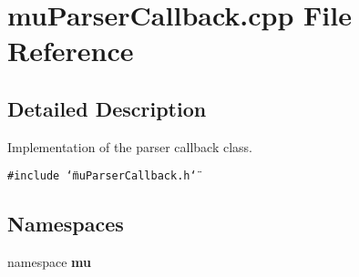 \section{muParserCallback.cpp File Reference}
\label{muParserCallback_8cpp}


\subsection{Detailed Description}
Implementation of the parser callback class. 



{\tt \#include \char`\"{}muParserCallback.h\char`\"{}}\par
\subsection*{Namespaces}
\begin{CompactItemize}
\item 
namespace {\bf mu}
\end{CompactItemize}
